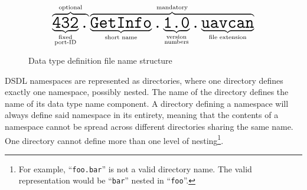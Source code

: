 \begin{figure}[H]
    $$
    \overbrace{%
        \underbrace{\texttt{\huge{432}}}_{\substack{\text{fixed} \\ \text{port-ID}}}%
        \texttt{\huge{.}}%
    }^{\text{optional}}%
    \overbrace{%
        \underbrace{\texttt{\huge{GetInfo}}}_{\substack{\text{short name}}}%
        \texttt{\huge{.}}%
        \underbrace{\texttt{\huge{1.0}}}_{\substack{\text{version} \\ \text{numbers}}}%
        \texttt{\huge{.}}%
        \underbrace{\texttt{\huge{uavcan}}}_{\text{file extension}}%
    }^{\text{mandatory}}
    $$
    \caption{Data type definition file name structure\label{fig:dsdl_definition_file_name_structure}}
\end{figure}

DSDL namespaces are represented as directories, where one directory defines exactly one namespace, possibly nested.
The name of the directory defines the name of its data type name component.
A directory defining a namespace will always define said namespace in its entirety,
meaning that the contents of a namespace cannot be spread across different directories sharing the same name.
One directory cannot define more than one level of
nesting\footnote{%
    For example, ``\texttt{foo.bar}'' is not a valid directory name.
    The valid representation would be ``\texttt{bar}'' nested in ``\texttt{foo}''.
}.

